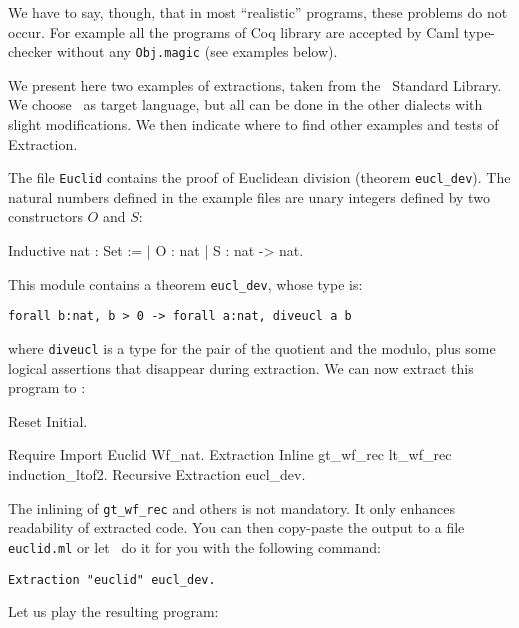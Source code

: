 We have to say, though, that in most ``realistic'' programs, these
problems do not occur. For example all the programs of Coq library are
accepted by Caml type-checker without any {\tt Obj.magic} (see examples below).




We present here two examples of extractions, taken from the 
\Coq\ Standard Library. We choose \ocaml\ as target language, 
but all can be done in the other dialects with slight modifications.
We then indicate where to find other examples and tests of Extraction.


The file {\tt Euclid} contains the proof of Euclidean division
(theorem {\tt eucl\_dev}). The natural numbers defined in the example
files are unary integers defined by two constructors $O$ and $S$:
\begin{coq_example*}
Inductive nat : Set :=
  | O : nat
  | S : nat -> nat.
\end{coq_example*}

This module contains a theorem {\tt eucl\_dev}, whose type is:
\begin{verbatim}
forall b:nat, b > 0 -> forall a:nat, diveucl a b
\end{verbatim}
where {\tt diveucl} is a type for the pair of the quotient and the
modulo, plus some logical assertions that disappear during extraction.
We can now extract this program to \ocaml:

\begin{coq_eval}
Reset Initial.
\end{coq_eval}
\begin{coq_example}
Require Import Euclid Wf_nat.
Extraction Inline gt_wf_rec lt_wf_rec induction_ltof2.
Recursive Extraction eucl_dev.
\end{coq_example}

The inlining of {\tt gt\_wf\_rec} and others is not
mandatory. It only enhances readability of extracted code.
You can then copy-paste the output to a file {\tt euclid.ml} or let 
\Coq\ do it for you with the following command: 

\begin{verbatim}
Extraction "euclid" eucl_dev.
\end{verbatim}

Let us play the resulting program:

